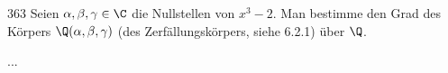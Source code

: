 \begin{algebraUE}{363}
  Seien $\alpha, \beta, \gamma \in \C$ die Nullstellen von $x^3 - 2.$ Man bestimme den Grad des Körpers $\Q(\alpha, \beta, \gamma)$ (des Zerfällungskörpers, siehe 6.2.1) über $\Q$.
\end{algebraUE}

\begin{solution}
...
\end{solution}
